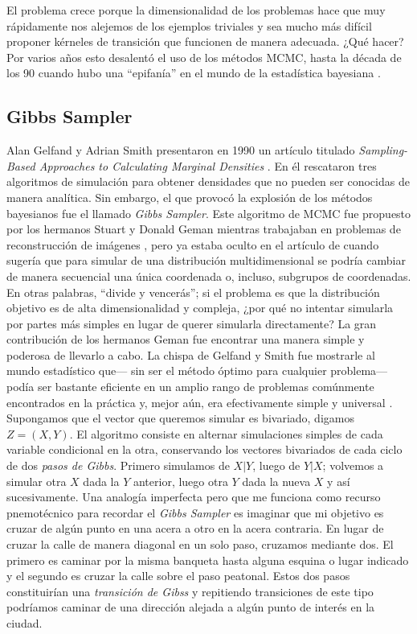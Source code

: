  El problema crece porque la dimensionalidad de los problemas hace que muy rápidamente nos alejemos de los ejemplos triviales y sea mucho más difícil proponer kérneles de transición que funcionen de manera adecuada. ¿Qué hacer? Por varios años esto desalentó el uso de los métodos MCMC, hasta la década de los 90 cuando hubo una ``epifanía'' en el mundo de la estadística bayesiana \parencite{RobertCasella11}. 

\subsection{Gibbs Sampler}

Alan Gelfand y Adrian Smith presentaron en 1990 un artículo titulado \textit{Sampling-Based Approaches to Calculating Marginal Densities} \parencite{GelfandSmith90}. En él rescataron tres algoritmos de simulación para obtener densidades que no pueden ser conocidas de manera analítica. Sin embargo, el que provocó la explosión de los métodos bayesianos fue el llamado \textit{Gibbs Sampler}. Este algoritmo de MCMC fue propuesto por los hermanos Stuart y Donald Geman mientras trabajaban en problemas de reconstrucción de imágenes \parencite{GemanGeman84}, pero ya estaba oculto en el artículo de \textcite{Hastings70} cuando sugería que para simular de una distribución multidimensional se podría cambiar de manera secuencial una única coordenada o, incluso, subgrupos de coordenadas.\\ 

En otras palabras, ``divide y vencerás''; si el problema es que la distribución objetivo es de alta dimensionalidad y compleja, ¿por qué no intentar simularla por partes más simples en lugar de querer simularla directamente? La gran contribución de los hermanos Geman fue encontrar una manera simple y poderosa de llevarlo a cabo. La chispa de Gelfand y Smith fue mostrarle al mundo estadístico que--- sin ser el método óptimo para cualquier problema--- podía ser bastante eficiente en un amplio rango de problemas comúnmente encontrados en la práctica y, mejor aún, era efectivamente simple y universal \parencite{GelfandEtAl90}.\\

Supongamos que el vector que queremos simular es bivariado, digamos $Z = (X,Y)$. El algoritmo consiste en alternar simulaciones simples de cada variable condicional en la otra, conservando los vectores bivariados de cada ciclo de dos \textit{pasos de Gibbs}. Primero simulamos de $X|Y$, luego de $Y|X$; volvemos a simular otra $X$ dada la $Y$ anterior, luego otra $Y$ dada la nueva $X$ y así sucesivamente. Una analogía imperfecta pero que me funciona como recurso pnemotécnico para recordar el \textit{Gibbs Sampler} es imaginar que mi objetivo es cruzar de algún punto en una acera a otro en la acera contraria. En lugar de cruzar la calle de manera diagonal en un solo paso, cruzamos mediante dos. El primero es caminar por la misma banqueta hasta alguna esquina o lugar indicado y el segundo es cruzar la calle sobre el paso peatonal. Estos dos pasos constituirían una \textit{transición de Gibss} y repitiendo transiciones de este tipo podríamos caminar de una dirección alejada a algún punto de interés en la ciudad.\\ 

